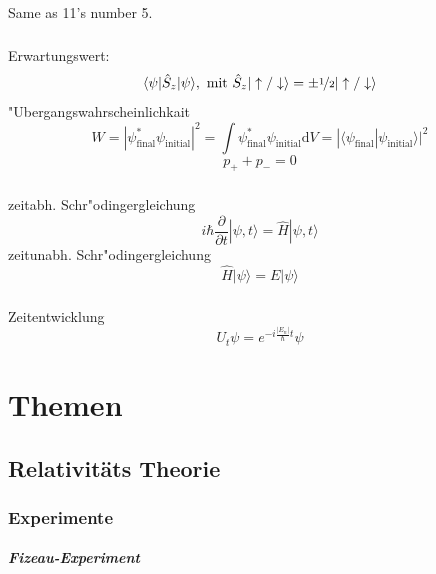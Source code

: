 \documentclass[12pt]{report}
\newcommand{\dd}{\mathrm{d}}
\begin{document}
\section{}

\subsection{}

Same as 11's number 5.

\subsection{}

Erwartungswert: 
\[\langle\psi|\hat{S}_z|\psi\rangle,\ \textrm{mit }\hat{S}_z|\uparrow/\downarrow\rangle=\pm\nicefrac{1}{2}|\uparrow/\downarrow\rangle\]
"Ubergangswahrscheinlichkait
\[W=|\psi^*_\mathrm{final}\psi_\mathrm{initial}|^2=\int\psi^*_\mathrm{final}\psi_\mathrm{initial}\dd V=|\langle\psi_\mathrm{final}|\psi_\mathrm{initial}\rangle|^2\]
\[p_++p_-=0\]

\subsection{}

zeitabh. Schr"odingergleichung
\[i\hbar\frac{\partial}{\partial t}|\psi,t\rangle=\hat{H}|\psi,t\rangle\]
zeitunabh. Schr"odingergleichung
\[\hat{H}|\psi\rangle=E|\psi\rangle\]

\subsection{}

Zeitentwicklung
\[U_t\psi=e^{-i\frac{|E_n|}{\hbar}t}\psi\]

\chapter{Themen}

\section{Relativitäts Theorie}

\subsection{Experimente}
\paragraph{Fizeau-Experiment}
\end{document}
